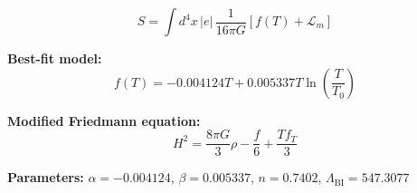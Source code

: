 
\begin{equation}
  S = \int d^4x \, |e| \, \frac{1}{16\pi G} \left[ f(T) + \mathcal{L}_m \right]
\end{equation}

\textbf{Best-fit model:}
\begin{equation}
  f(T) = -0.004124 T + 0.005337 T \ln\!\left(\frac{T}{T_0}\right)
\end{equation}

\textbf{Modified Friedmann equation:}
\begin{equation}
  H^2 = \frac{8\pi G}{3} \rho - \frac{f}{6} + \frac{T f_T}{3}
\end{equation}

\textbf{Parameters:}
$\alpha = -0.004124$, \quad
$\beta = 0.005337$, \quad
$n = 0.7402$, \quad
$\Lambda_{\text{BI}} = 547.3077$